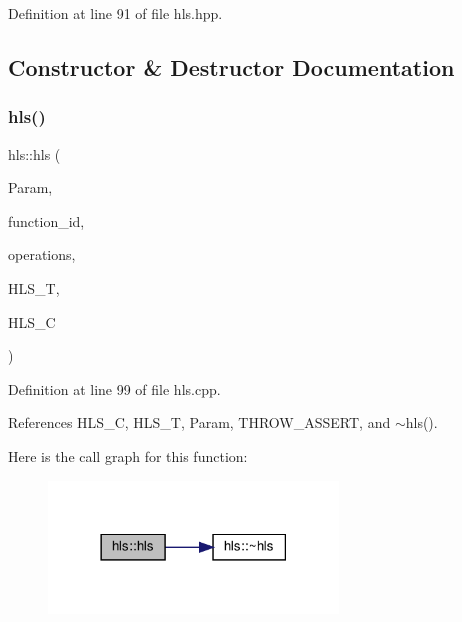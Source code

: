 Definition at line 91 of file hls.\+hpp.



\subsection{Constructor \& Destructor Documentation}
\mbox{\label{classhls_a570eb6f6ceb989ed92923ccb318df05c}} 
\subsubsection{\texorpdfstring{hls()}{hls()}}
{\footnotesize\ttfamily hls\+::hls (\begin{DoxyParamCaption}\item[{const \hyperlink{Parameter_8hpp_a37841774a6fcb479b597fdf8955eb4ea}{Parameter\+Const\+Ref}}]{Param,  }\item[{unsigned int}]{function\+\_\+id,  }\item[{\hyperlink{classOpVertexSet}{Op\+Vertex\+Set}}]{operations,  }\item[{const \hyperlink{hls__target_8hpp_a390f1d55d3b31739665ff2776abe2a3f}{H\+L\+S\+\_\+target\+Ref}}]{H\+L\+S\+\_\+T,  }\item[{const \hyperlink{hls__constraints_8hpp_ac394d1c5cd991614133724294a79182b}{H\+L\+S\+\_\+constraints\+Ref}}]{H\+L\+S\+\_\+C }\end{DoxyParamCaption})}



Definition at line 99 of file hls.\+cpp.



References H\+L\+S\+\_\+C, H\+L\+S\+\_\+T, Param, T\+H\+R\+O\+W\+\_\+\+A\+S\+S\+E\+RT, and $\sim$hls().

Here is the call graph for this function\+:
\nopagebreak
\begin{figure}[H]
\begin{center}
\leavevmode
\includegraphics[width=218pt]{d5/d18/classhls_a570eb6f6ceb989ed92923ccb318df05c_cgraph}
\end{center}
\end{figure}
\mbox{\label{classhls_ae4186144f6fabfb957fbea22608d86fa}} 
